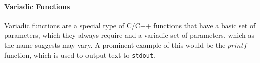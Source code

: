 \paragraph{Variadic Functions}
\label{subsection:variadicfunctions}
Variadic functions are a special type of C/C++ functions that have a basic set of parameters, 
which they always require and a variadic set of parameters, which as the name suggests 
may vary. A prominent example of this would be the $printf$ function, which is used 
to output text to \texttt{stdout}.


